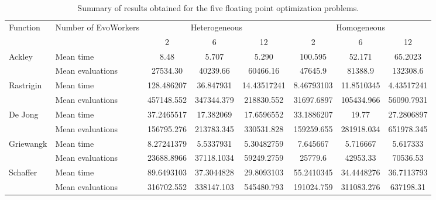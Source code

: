 \documentclass[conference]{IEEEtran}
\begin{document}
\begin{table}[t]
  \centering
  \caption{Summary of results obtained for the five floating point
      optimization problems. }
    \label{fig:summary}
    \begin{tabular}{|l|l|c|c|c|c|c|c|}
      \hline 
      \multirow{2}{*}{Function} & \multirow{2}{*}{Number of EvoWorkers} &  \multicolumn{3}{|c|}{Heterogeneous} & \multicolumn{3}{|c|}{Homogeneous}\\
      \cline{3-8}
                                & & 2 & 6 & 12 & 2 & 6 & 12\\
            \hline 
      \multirow{2}{*}{Ackley} & Mean time & 8.48& 5.707& 5.290 & 100.595 & 52.171 & 65.2023\\
      \cline{2-8}
                                & Mean evaluations & 27534.30 & 40239.66 & 60466.16 & 47645.9 & 81388.9 & 132308.6 \\
      \hline 
      \multirow{2}{*}{Rastrigin} & Mean time &  128.486207 & 36.847931 & 14.43517241 & 8.46793103 & 11.8510345 &  4.43517241 \\
      \cline{2-8} 
                                & Mean evaluations & 457148.552 & 347344.379 & 218830.552 & 31697.6897 & 105434.966 & 56090.7931 \\
      \hline
      \multirow{2}{*}{De Jong} & Mean time & 37.2465517 & 17.382069 & 17.6596552 & 33.1886207 & 19.77 & 27.2806897 \\
      \cline{2-8}

                                & Mean evaluations & 156795.276 & 213783.345 & 330531.828 & 159259.655 & 281918.034 & 651978.345 \\
      \hline
      \multirow{2}{*}{Griewangk} & Mean time & 8.27241379 & 5.5337931 & 5.30482759 & 7.645667 & 5.716667 & 5.617333 \\
      \cline{2-8}

                                & Mean evaluations & 23688.8966 & 37118.1034 & 59249.2759 & 25779.6 & 42953.33 & 70536.53 \\
            \hline

      \multirow{2}{*}{Schaffer} & Mean time &  89.6493103 & 37.3044828 & 29.8093103 & 55.2410345 & 34.4448276 & 36.7113793 \\
            \cline{2-8}
                                & Mean evaluations & 316702.552  & 338147.103 & 545480.793 & 191024.759 & 311083.276 & 637198.31 \\
            \hline

       \end{tabular}

\end{table}
\end{document}
